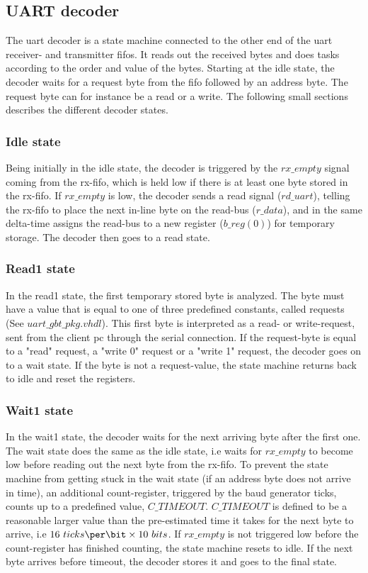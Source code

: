 \documentclass[main.tex]{subfiles}
\begin{document}
\subsection{UART decoder}
The \gls{uart} decoder is a state machine connected to the other end of the \gls{uart} receiver- and transmitter \glspl{fifo}. It reads out the received bytes and does tasks according to the order and value of the bytes. Starting at the idle state, the decoder waits for a request byte from the fifo followed by an address byte. The request byte can for instance be a read or a write. The following small sections describes the different decoder states. 

\subsubsection{Idle state}
Being initially in the idle state, the decoder is triggered by the $rx\_empty$ signal coming from the rx-fifo, which is held low if there is at least one byte stored in the rx-fifo. If $rx\_empty$ is low, the decoder sends a read signal ($rd\_uart$), telling the rx-fifo to place the next in-line byte on the read-bus ($r\_data$), and in the same delta-time assigns the read-bus to a new register ($b\_reg(0)$) for temporary storage. The decoder then goes to a read state.

\subsubsection{Read1 state}
 In the read1 state, the first temporary stored byte is analyzed. The byte must have a value that is equal to one of three predefined constants, called requests (See $uart\_gbt\_pkg.vhdl$). This first byte is interpreted as a read- or write-request, sent from the client \acrshort{pc} through the serial connection. If the request-byte is equal to a "read" request, a "write 0" request or a "write 1" request, the decoder goes on to a wait state. If the byte is not a request-value, the state machine returns back to idle and reset the registers.

\subsubsection{Wait1 state}
  In the wait1 state, the decoder waits for the next arriving byte after the first one. The wait state does the same as the idle state, i.e waits for $rx\_empty$ to become low before reading out the next byte from the rx-fifo. To prevent the state machine from getting stuck in the wait state (if an address byte does not arrive in time), an additional count-register, triggered by the baud generator ticks, counts up to a predefined value, $C\_TIMEOUT$. $C\_TIMEOUT$ is defined to be a reasonable larger value than the pre-estimated time it takes for the next byte to arrive, i.e $16 ~ticks\per\bit \times 10 ~bits$. If $rx\_empty$ is not triggered low before the count-register has finished counting, the state machine resets to idle. If the next byte arrives before timeout, the decoder stores it and goes to the final state.
\end{document}

